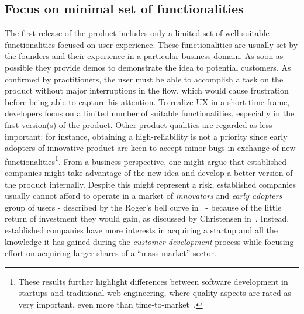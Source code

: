 \documentclass[10pt,journal,letterpaper,compsoc]{IEEEtran}
\begin{document}
\subsection{Focus on minimal set of functionalities} 
The first release of the product includes only a limited set of well suitable 
functionalities focused on user experience. These functionalities are 
usually set by the founders and their experience in a particular business 
domain. As soon as possible they provide demos to demonstrate the idea to 
potential customers. 
As confirmed by practitioners, the user must be able to accomplish a task on 
the product without major interruptions in the flow, which would cause 
frustration before being able to capture his attention. To realize UX in a 
short time frame, developers focus on a limited number of suitable 
functionalities, especially in the first version(s) of the product. Other 
product qualities are regarded as less important: for instance, obtaining a 
high-reliability is not a priority since early adopters of innovative product 
are keen to accept minor bugs in exchange of new functionalities\footnote{These 
results further highlight differences between software development in startups 
and traditional web engineering, where quality aspects are rated as very 
important, even more than time-to-market~\cite{Offutt2002}.}. From a business 
perspective, one might argue that established companies might take advantage of 
the new idea and develop a better version of the product internally. Despite 
this might represent a risk, established companies usually cannot afford to 
operate in a market of \textit{innovators} and \textit{early adopters} group 
of users - described by the Roger's bell curve in~\cite{Rogers} - because of 
the little return of investment they would gain, as discussed by Christensen 
in~\cite{Christensen2003}. Instead, established companies have more interests 
in acquiring a startup and all the knowledge it has gained during the 
\textit{customer development} process while focusing effort on acquiring larger
shares of a ``mass market'' sector. 
\end{document}
